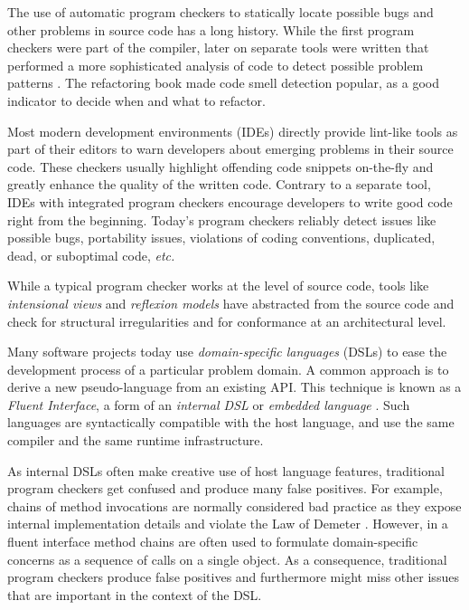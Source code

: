 \documentclass[10pt,twocolumn]{article}
\newcommand{\lr}[1]{\nb{LR}{#1}}
\newcommand{\TG}[1]{\nb{TG}{#1}}
\newcommand{\etc}{\emph{etc.}\xspace}
\begin{document}
The use of automatic program checkers to statically locate possible bugs and other problems in source code has a long history. While the first program checkers were part of the compiler, later on separate tools were written that performed a more sophisticated analysis of code to detect possible problem patterns \cite{John83a}. The refactoring book \cite{Fowl99b} made code smell detection popular, as a good indicator to decide when and what to refactor.

Most modern development environments (IDEs) directly provide lint-like tools as part of their editors to warn developers about emerging problems in their source code. These checkers usually highlight offending code snippets on-the-fly and greatly enhance the quality of the written code. Contrary to a separate tool, IDEs with integrated program checkers encourage developers to write good code right from the beginning. Today's program checkers \cite{Hove04a} reliably detect issues like possible bugs, portability issues, violations of coding conventions, duplicated, dead, or suboptimal code, \etc

While a typical program checker works at the level of source code, tools like \emph{intensional views} \cite{Mens06a} and \emph{reflexion models} \cite{Murp95a} have abstracted from the source code and check for structural irregularities and for conformance at an architectural level. %

Many software projects today use \emph{domain-specific languages} (DSLs) to ease the development process of a particular problem domain. A common approach is to derive a new pseudo-language from an existing API. This technique is known as a \emph{Fluent Interface}, a form of an \emph{internal DSL} or \emph{embedded language} \cite{Fowl08X}. Such languages are syntactically compatible with the host language, and use the same compiler and the same runtime infrastructure.

As internal DSLs often make creative use of host language features, traditional program checkers get confused and produce many false positives. For example, chains of method invocations are normally considered bad practice as they expose internal implementation details and violate the Law of Demeter \cite{Lieb89b}. However, in a fluent interface method chains are often used to formulate domain-specific concerns as a sequence of calls on a single object. As a consequence, traditional program checkers produce false positives and furthermore might miss other issues that are important in the context of the DSL.
\end{document}
